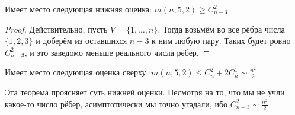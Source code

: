 \begin{proposition}
	Имеет место следующая нижняя оценка: \(m(n, 5, 2) \ge C_{n - 3}^2\)
\end{proposition}

\begin{proof}
	Действительно, пусть $V = \{1, \ldots, n\}$. Тогда возьмём во все рёбра числа $\{1, 2, 3\}$ и доберём из оставшихся $n - 3$ к ним любую пару. Таких будет ровно $C_{n - 3}^2$, и это заведомо меньше реального числа рёбер.
\end{proof}

\begin{theorem}
	Имеет место следующая оценка сверху: \(m(n, 5, 2) \le C_n^2 + 2C_n^1 \sim \frac{n^2}{2}\)
\end{theorem}

\begin{note}
	Эта теорема проясняет суть нижней оценки. Несмотря на то, что мы не учли какое-то число рёбер, асимптотически мы точно угадали, ибо $C_{n - 3}^2 \sim \frac{n^2}{2}$
\end{note}

